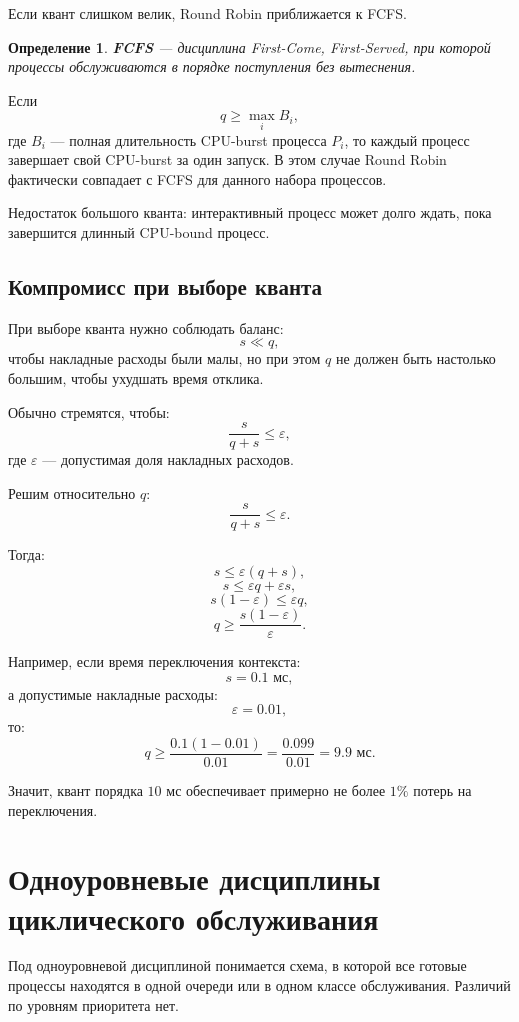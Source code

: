 \documentclass[12pt,a4paper]{article}
\newtheorem{definition}{Определение}
\begin{document}
Если квант слишком велик, Round Robin приближается к FCFS.

\begin{definition}
\textbf{FCFS} --- дисциплина First-Come, First-Served, при которой процессы обслуживаются в порядке поступления без вытеснения.
\end{definition}

Если
\[
q \geq \max_i B_i,
\]
где $B_i$ --- полная длительность CPU-burst процесса $P_i$, то каждый процесс завершает свой CPU-burst за один запуск. В этом случае Round Robin фактически совпадает с FCFS для данного набора процессов.

Недостаток большого кванта: интерактивный процесс может долго ждать, пока завершится длинный CPU-bound процесс.

\subsection{Компромисс при выборе кванта}

При выборе кванта нужно соблюдать баланс:
\[
s \ll q,
\]
чтобы накладные расходы были малы, но при этом $q$ не должен быть настолько большим, чтобы ухудшать время отклика.

Обычно стремятся, чтобы:
\[
\frac{s}{q+s} \leq \varepsilon,
\]
где $\varepsilon$ --- допустимая доля накладных расходов.

Решим относительно $q$:
\[
\frac{s}{q+s} \leq \varepsilon.
\]

Тогда:
\[
s \leq \varepsilon(q+s),
\]
\[
s \leq \varepsilon q + \varepsilon s,
\]
\[
s(1-\varepsilon) \leq \varepsilon q,
\]
\[
q \geq \frac{s(1-\varepsilon)}{\varepsilon}.
\]

Например, если время переключения контекста:
\[
s = 0.1 \text{ мс},
\]
а допустимые накладные расходы:
\[
\varepsilon = 0.01,
\]
то:
\[
q \geq \frac{0.1(1-0.01)}{0.01} = \frac{0.099}{0.01} = 9.9 \text{ мс}.
\]

Значит, квант порядка $10$ мс обеспечивает примерно не более $1\%$ потерь на переключения.

\section{Одноуровневые дисциплины циклического обслуживания}

Под одноуровневой дисциплиной понимается схема, в которой все готовые процессы находятся в одной очереди или в одном классе обслуживания. Различий по уровням приоритета нет.
\end{document}
